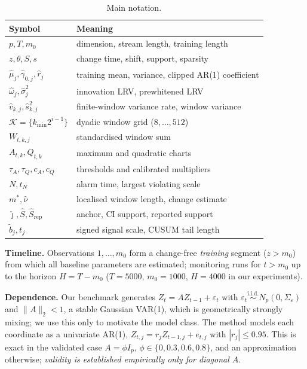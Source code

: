\documentclass[conference]{IEEEtran}
\newcommand{\hs}{\hat{s}}
\begin{document}
\begin{table}[t]
\centering
\caption{Main notation.}
\label{tab:notation}
\small
\begin{tabular}{@{}ll@{}}
\toprule
Symbol & Meaning\\
\midrule
$p,T,m_0$ & dimension, stream length, training length\\
$z,\theta,S,s$ & change time, shift, support, sparsity\\
$\hat\mu_j,\hat\gamma_{0,j},\hat r_j$ & training mean, variance, clipped AR(1) coefficient\\
$\hat\omega_j,\hat\sigma^2_j$ & innovation LRV, prewhitened LRV\\
$\hat v_{k,j},\hs^2_{k,j}$ & finite-window variance rate, window variance\\
$\mathcal{K}=\{k_{\min}2^{i-1}\}$ & dyadic window grid ($8,\dots,512$)\\
$W_{t,k,j}$ & standardised window sum\\
$A_{t,k},Q_{t,k}$ & maximum and quadratic charts\\
$\tau_A,\tau_Q,c_A,c_Q$ & thresholds and calibrated multipliers\\
$N,t_N$ & alarm time, largest violating scale\\
$m^*,\hat\nu$ & localised window length, change estimate\\
$\hat\jmath,\hat S,\hat S_{\mathrm{rep}}$ & anchor, CI support, reported support\\
$\tilde b_j,t_j$ & signed signal scale, CUSUM tail length\\
\bottomrule
\end{tabular}
\end{table}

\textbf{Timeline.} Observations $1,\dots,m_0$ form a change-free \emph{training} segment ($z>m_0$) from which all baseline parameters are estimated; monitoring runs for $t>m_0$ up to the horizon $H=T-m_0$ ($T=5000$, $m_0=1000$, $H=4000$ in our experiments).

\textbf{Dependence.} Our benchmark generates $Z_t=AZ_{t-1}+\varepsilon_t$ with $\varepsilon_t\overset{\text{i.i.d.}}{\sim}N_p(0,\Sigma_\varepsilon)$ and $\|A\|_2<1$, a stable Gaussian VAR(1), which is geometrically strongly mixing; we use this only to motivate the model class. The method models each coordinate as a univariate AR(1), $Z_{t,j}=r_jZ_{t-1,j}+e_{t,j}$ with $|r_j|\le 0.95$. This is exact in the validated case $A=\phi I_p$, $\phi\in\{0,0.3,0.6,0.8\}$, and an approximation otherwise; \emph{validity is established empirically only for diagonal $A$}.
\end{document}
